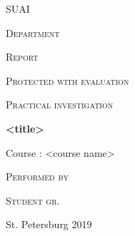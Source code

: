 \documentclass{report}
\begin{document}
\begin{titlepage}
	\begin{center}
	    {\scshape\LARGE SUAI \par}
    	\vspace{1cm}
    	{\scshape\Large Department \par}
	\end{center}
	
	{\scshape\Large Report\par}
	{\scshape\Large Protected with evaluation\par}
	
	\centering
	\vspace{1cm}
	

	\vspace{3cm}
	
	{\scshape\LARGE Practical investigation \no  \par}
	
	{\huge\bfseries <title>\par}
	\vspace{1.5cm}
	{\LARGE Course : <course name>  \par}
	
	\vfill
	\raggedright
	{\scshape\Large Performed by\par}
	{\scshape\Large Student gr. \no \par}
	
	\centering
	\vspace{1cm}
	
	\vfill
    
    {\large St. Petersburg 2019\par}
\end{titlepage}
\end{document}
